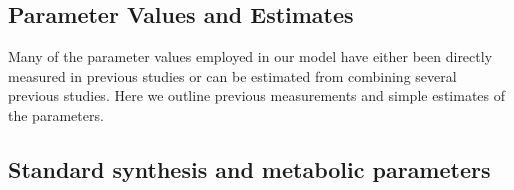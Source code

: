 \documentclass{pnastwo}
\begin{document}
\begin{article}


\section*{Parameter Values and Estimates}

Many of the parameter values employed in our model have either been directly measured in previous studies or can be estimated from combining several previous studies. Here we outline previous measurements and simple estimates of the parameters. 

\subsection*{Standard synthesis and metabolic parameters}


\end{article}
\end{document}
